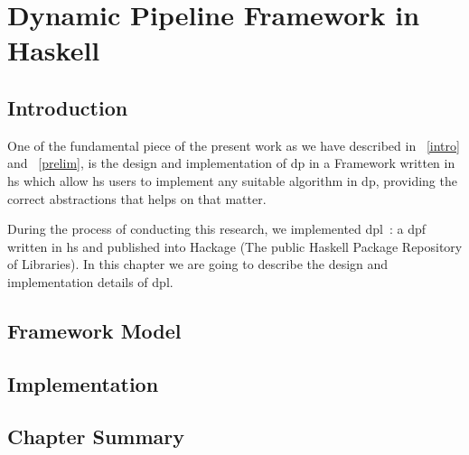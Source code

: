 \chapter{Dynamic Pipeline Framework in Haskell}\label{dp-hs}
\section{Introduction}
One of the fundamental piece of the present work as we have described in ~\autoref{intro} and ~\autoref{prelim},
is the design and implementation of \acrshort{dp} in a Framework written in \acrshort{hs} which allow \acrshort{hs} users
to implement any suitable algorithm in \acrshort{dp}, providing the correct abstractions that helps on that matter.

During the process of conducting this research, we implemented \acrfull{dpl}~\cite{dynamic-pipeline}: 
a \acrfull{dpf} written in \acrshort{hs} and published into Hackage (The public Haskell Package Repository of Libraries).
In this chapter we are going to describe the design and implementation details of \acrshort{dpl}.

\section{Framework Model}
\section{Implementation}
\section{Chapter Summary}

